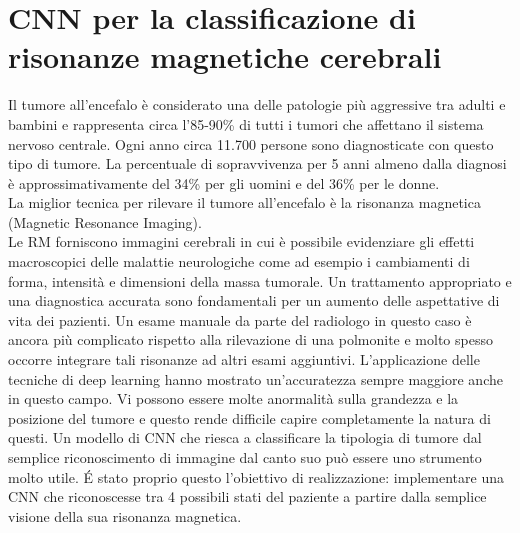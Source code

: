 \section{CNN per la classificazione di risonanze magnetiche cerebrali}
Il tumore all’encefalo è considerato una delle patologie più aggressive tra adulti 
e bambini e rappresenta circa l’85-90\% di tutti i tumori che affettano il sistema 
nervoso centrale. Ogni anno circa 11.700 persone sono diagnosticate con questo tipo 
di tumore. La percentuale di sopravvivenza per 5 anni almeno dalla diagnosi è approssimativamente del 34\% per gli uomini e del 36\% per le donne. \\ 
La miglior tecnica per rilevare il tumore all’encefalo è la risonanza magnetica (Magnetic Resonance Imaging). \\
Le RM forniscono immagini cerebrali in cui è possibile evidenziare gli effetti macroscopici
delle malattie neurologiche come ad esempio i cambiamenti di forma, intensità e dimensioni della massa tumorale. Un trattamento appropriato e una diagnostica accurata sono fondamentali per un aumento delle aspettative di vita dei pazienti. 
Un esame manuale da parte del radiologo in questo caso è ancora più complicato rispetto alla rilevazione di una polmonite e molto spesso occorre integrare tali risonanze ad altri esami aggiuntivi.
L’applicazione delle tecniche di deep learning  hanno mostrato un’accuratezza sempre maggiore anche in questo campo. Vi possono essere molte anormalità sulla grandezza e la posizione del tumore e questo rende difficile capire completamente la natura di questi. Un modello di CNN che riesca a classificare la tipologia di tumore dal semplice riconoscimento di immagine dal canto suo può essere uno strumento molto utile. É stato proprio questo l’obiettivo di realizzazione: implementare una CNN che riconoscesse tra 4 possibili stati del paziente a partire dalla semplice visione della sua risonanza magnetica. 
